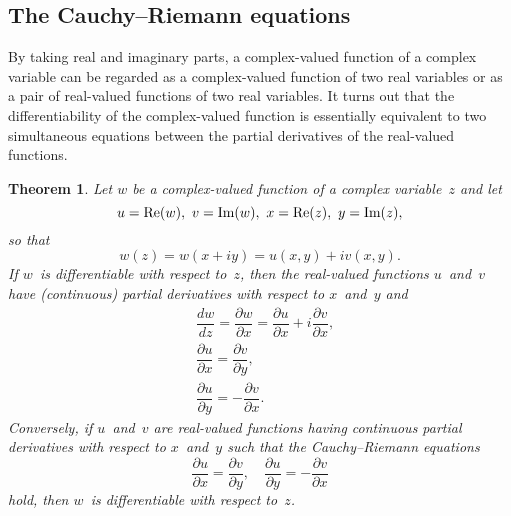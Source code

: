 \documentclass{amsproc}
\newtheorem{theorem}{Theorem}[subsection]
\theoremstyle{definition}
\theoremstyle{remark}
\renewcommand{\Im}{\mathop{\textup{Im}}}
\renewcommand{\Re}{\mathop{\textup{Re}}}
\renewcommand{\d}{\partial}
\numberwithin{equation}{section}
\begin{document}
\vfill\pagebreak



\subsection{The Cauchy--Riemann equations} \label{CMS4}

By taking real and imaginary parts, a complex-valued function of a complex variable can be regarded as a complex-valued function of two real variables or as a pair
of real-valued functions of two real variables. It turns out that the differentiability of the complex-valued function is essentially equivalent to two simultaneous
equations between the partial derivatives of the real-valued functions.

\begin{theorem} \label{CMT4.1}
Let $ w $ be a complex-valued function of a complex variable~$ z $ and let
$$
u = \Re(w),\ v = \Im(w),\ x = \Re(z),\ y = \Im(z),
$$
so that
$$
w(z) = w(x + iy) = u(x,y) + i v(x,y).
$$
If $ w $~is differentiable with respect to~$ z $, then the real-valued functions $ u $~and~$ v $ have (continuous) partial derivatives with respect to $ x $~and~$ y $ and
\begin{align*}
&\dfrac{dw}{dz} = \dfrac{\d w}{\d x} = \dfrac{\d u}{\d x} + i\dfrac{\d v}{\d x}, \\
&\dfrac{\d u}{\d x} = \dfrac{\d v}{\d y}, \\
&\dfrac{\d u}{\d y} = -\dfrac{\d v}{\d x}.
\end{align*}
Conversely, if $ u $~and~$ v $ are real-valued functions having continuous partial derivatives with respect to $ x $~and~$ y $ such that
the \emph{Cauchy--Riemann equations}
$$
\dfrac{\d u}{\d x} = \dfrac{\d v}{\d y}, \quad \dfrac{\d u}{\d y} = -\dfrac{\d v}{\d x}
$$
hold, then $ w $~is differentiable with respect to~$ z $.
\end{theorem}
\end{document}
